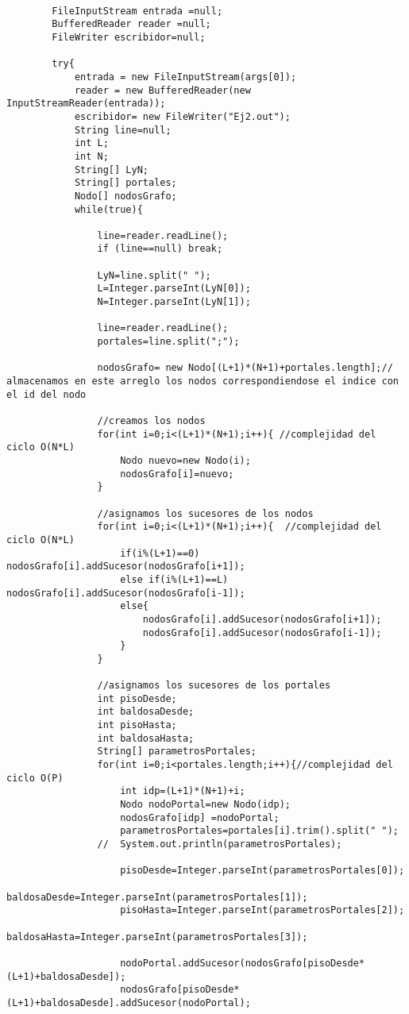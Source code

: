 \documentclass[a4paper]{article}
\begin{document}
\begin{lstlisting}

		FileInputStream entrada =null;  
		BufferedReader reader =null;
		FileWriter escribidor=null;
		
		try{
			entrada = new FileInputStream(args[0]);
			reader = new BufferedReader(new InputStreamReader(entrada));
			escribidor= new FileWriter("Ej2.out");				
			String line=null;	
			int L;
			int N;	
			String[] LyN;
			String[] portales;
			Nodo[] nodosGrafo;	
			while(true){
				
				line=reader.readLine();
				if (line==null) break;

				LyN=line.split(" ");
				L=Integer.parseInt(LyN[0]);
				N=Integer.parseInt(LyN[1]);
				
				line=reader.readLine();
				portales=line.split(";");
				
				nodosGrafo= new Nodo[(L+1)*(N+1)+portales.length];// almacenamos en este arreglo los nodos correspondiendose el indice con el id del nodo
				
				//creamos los nodos
				for(int i=0;i<(L+1)*(N+1);i++){ //complejidad del ciclo O(N*L)
					Nodo nuevo=new Nodo(i);
					nodosGrafo[i]=nuevo;
				}
				
				//asignamos los sucesores de los nodos
				for(int i=0;i<(L+1)*(N+1);i++){  //complejidad del ciclo O(N*L)
					if(i%(L+1)==0) nodosGrafo[i].addSucesor(nodosGrafo[i+1]);
					else if(i%(L+1)==L) nodosGrafo[i].addSucesor(nodosGrafo[i-1]);
					else{
						nodosGrafo[i].addSucesor(nodosGrafo[i+1]);
						nodosGrafo[i].addSucesor(nodosGrafo[i-1]);
					}
				}
				
				//asignamos los sucesores de los portales
				int pisoDesde;
				int baldosaDesde;
				int pisoHasta;
				int baldosaHasta;
				String[] parametrosPortales;
				for(int i=0;i<portales.length;i++){//complejidad del ciclo O(P)
					int idp=(L+1)*(N+1)+i;
					Nodo nodoPortal=new Nodo(idp);
					nodosGrafo[idp] =nodoPortal;
					parametrosPortales=portales[i].trim().split(" ");
				//	System.out.println(parametrosPortales);
					
					pisoDesde=Integer.parseInt(parametrosPortales[0]);
					baldosaDesde=Integer.parseInt(parametrosPortales[1]);
					pisoHasta=Integer.parseInt(parametrosPortales[2]);
					baldosaHasta=Integer.parseInt(parametrosPortales[3]);

					nodoPortal.addSucesor(nodosGrafo[pisoDesde*(L+1)+baldosaDesde]);
					nodosGrafo[pisoDesde*(L+1)+baldosaDesde].addSucesor(nodoPortal);
					

\end{lstlisting}
\end{document}
